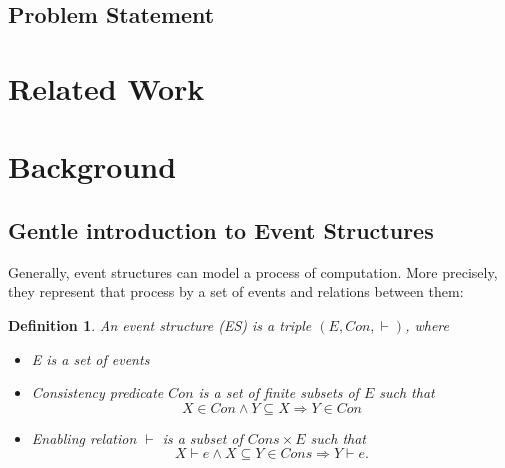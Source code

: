 \documentclass[conference]{IEEEtran}
\newtheorem{definition}{Definition}
\begin{document}
\subsection{Problem Statement}





\section{Related Work}


\section{Background}

\subsection{Gentle introduction to Event Structures}

Generally, event structures can model a process of computation. More precisely, they represent that process by a set of events and relations between them: 
\begin{definition}
An event structure (ES) is a triple $(E, Con, \vdash)$, where
\begin{itemize}
    \item E is a set of events
    \item Consistency predicate $Con$ is a set of finite subsets of $E$ such that 
        $$ X \in Con \land Y \subseteq X \Longrightarrow Y \in Con $$
    \item Enabling relation $\vdash$ is a subset of $Cons \times E$ such that
        $$X \vdash e \land X \subseteq Y \in Cons \Longrightarrow Y \vdash e.$$
\end{itemize}
\end{definition}
\end{document}
